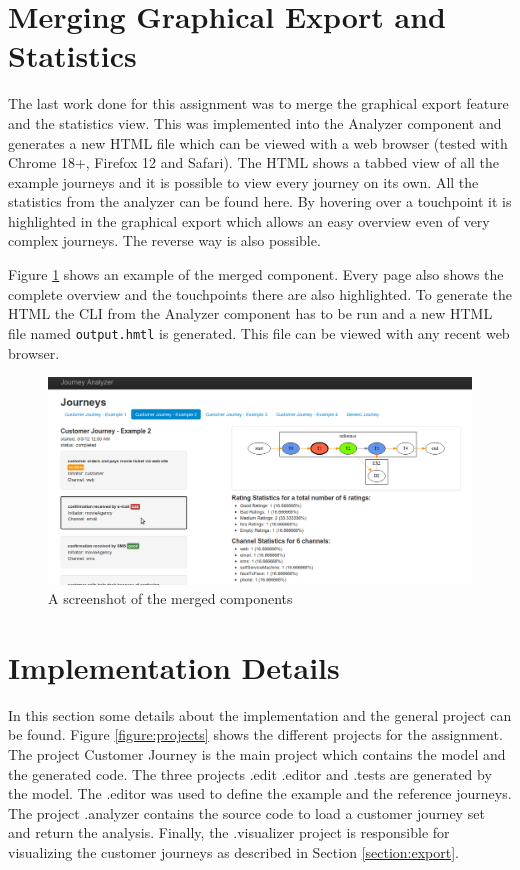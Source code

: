 \documentclass[12pt]{scrartcl}
\begin{document}
\section{Merging Graphical Export and Statistics}
\label{section:merge}

The last work done for this assignment was to merge the graphical export feature and the statistics view. This was
implemented into the Analyzer component and generates a new HTML file which can be viewed with a web browser (tested
with Chrome 18+, Firefox 12 and Safari). The HTML shows a tabbed view of all the example journeys and it is possible to view
every journey on its own. All the statistics from the analyzer can be found here. By hovering over a touchpoint
it is highlighted in the graphical export which allows an easy overview even of very complex journeys. The reverse
way is also possible.

Figure \ref{figure:merge_figure} shows an example of the merged component. Every page also shows the complete overview
and the touchpoints there are also highlighted. To generate the HTML the CLI from the Analyzer component has to be run
and a new HTML file named \lstinline!output.hmtl! is generated. This file can be viewed with any recent web browser.

\begin{figure}[hbtp]
	\centering
	\includegraphics[scale=0.35]{img/merge_sample1.png}
	\caption{A screenshot of the merged components}
	\label{figure:merge_figure}
\end{figure}


\section{Implementation Details}
\label{section:impl}

In this section some details about the implementation and the general project can be found. Figure \ref{figure:projects} 
shows the different projects for the assignment. The project Customer Journey is the main project 
which contains the model and the generated code. The three projects .edit .editor and .tests are generated by the model. 
The .editor was used to define the example and the reference journeys. The project .analyzer contains the source code to 
load a customer journey set and return the analysis. Finally, the .visualizer project is responsible for visualizing the 
customer journeys as described in Section \ref{section:export}.
\end{document}
